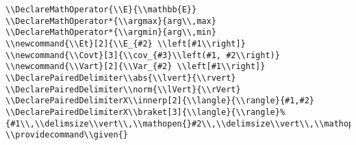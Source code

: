 \documentclass[c]{article}
\DeclareMathOperator{\Var}{Var}
\DeclareMathOperator{\cov}{Cov}
\DeclareMathOperator{\E}{\mathbb{E}}
\DeclareMathOperator*{\argmax}{arg\,max}
\DeclareMathOperator*{\argmin}{arg\,min}
\newcommand{\Et}[2]{\E_{#2} \left[#1\right]}
\newcommand{\Covt}[3]{\cov_{#3}\left(#1, #2\right)}
\newcommand{\Vart}[2]{\Var_{#2} \left[#1\right]}
\DeclarePairedDelimiter\abs{\lvert}{\rvert}
\DeclarePairedDelimiter\norm{\lVert}{\rVert}
\providecommand\given{}
\renewcommand\given{\nonscript\:\delimsize\vert\nonscript\:\mathopen{}}
\renewcommand\given{\nonscript\:\delimsize\vert\nonscript\:\mathopen{}}
\renewcommand\given{\nonscript\:\delimsize\vert\nonscript\:\mathopen{}}
\renewcommand\given{\nonscript\:\delimsize\vert\nonscript\:\mathopen{}}
\theoremstyle{plain}%
\theoremstyle{definition}
\theoremstyle{remark}
\begin{document}
\begin{verbatim}
\\DeclareMathOperator{\\E}{\\mathbb{E}}
\\DeclareMathOperator*{\\argmax}{arg\\,max}
\\DeclareMathOperator*{\\argmin}{arg\\,min}
\\newcommand{\\Et}[2]{\\E_{#2} \\left[#1\\right]}
\\newcommand{\\Covt}[3]{\\cov_{#3}\\left(#1, #2\\right)}
\\newcommand{\\Vart}[2]{\\Var_{#2} \\left[#1\\right]}
\\DeclarePairedDelimiter\\abs{\\lvert}{\\rvert}
\\DeclarePairedDelimiter\\norm{\\lVert}{\\rVert}
\\DeclarePairedDelimiterX\\innerp[2]{\\langle}{\\rangle}{#1,#2}
\\DeclarePairedDelimiterX\\braket[3]{\\langle}{\\rangle}%
{#1\\,\\delimsize\\vert\\,\\mathopen{}#2\\,\\delimsize\\vert\\,\\mathopen{}#3}
\\providecommand\\given{}

\end{verbatim}
\end{document}
